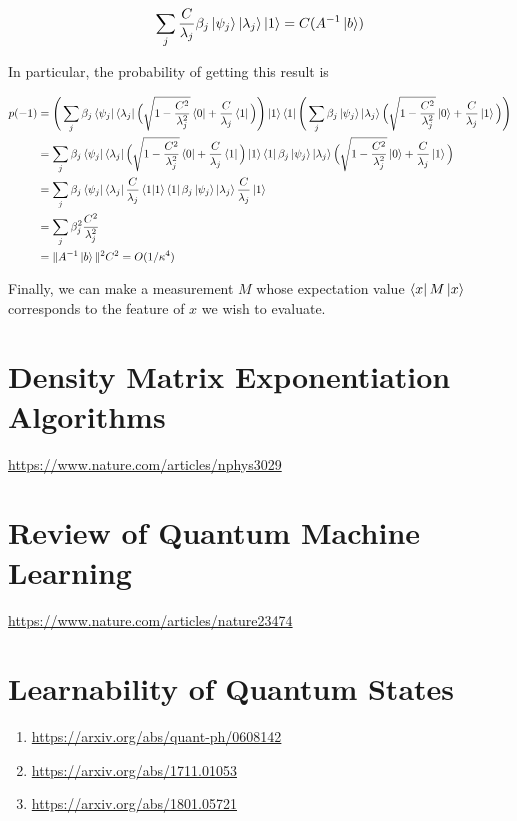 \documentclass[11pt]{article}
\newcommand\0{\mathbf{0}}
\newcommand\<{\langle}
\renewcommand\>{\rangle}
\begin{document}
\begin{align*}
	\sum_j \frac{C}{\lambda_j} \beta_j \ket{\psi_j} \ket{\lambda_j}\ket{1} = C (A^{-1} \ket{b})
\end{align*}

In particular, the probability of getting this result is 

\begin{align*} 
	p(-1) &= \Bigg(\sum_j \beta_j \bra{\psi_j} \bra{\lambda_j} \Big(\sqrt{1-\frac{C^2}{\lambda_j^2}}\bra{0} + \frac{C}{\lambda_j}\bra{1}\Big) \Bigg)\ket{1}\bra{1} \Bigg(\sum_j \beta_j \ket{\psi_j} \ket{\lambda_j} \Big(\sqrt{1-\frac{C^2}{\lambda_j^2}}\ket{0} + \frac{C}{\lambda_j}\ket{1}\Big)\Bigg) \\
	&= \sum_j \beta_j \bra{\psi_j} \bra{\lambda_j} \Big(\sqrt{1-\frac{C^2}{\lambda_j^2}}\bra{0} + \frac{C}{\lambda_j}\bra{1}\Big) \ket{1}\bra{1} \beta_j \ket{\psi_j} \ket{\lambda_j} \Big(\sqrt{1-\frac{C^2}{\lambda_j^2}}\ket{0} + \frac{C}{\lambda_j}\ket{1}\Big) \\
	&= \sum_j \beta_j \bra{\psi_j} \bra{\lambda_j} \frac{C}{\lambda_j}\bra{1}\ket{1}\bra{1} \beta_j \ket{\psi_j} \ket{\lambda_j} \frac{C}{\lambda_j}\ket{1} \\
	&= \sum_j \beta_j^2 \frac{C^2}{\lambda_j^2} \\
	&= \| A^{-1} \ket{b} \|^2 C^2 = O(1/\kappa^4)
\end{align*} 

Finally, we can make a measurement $M$ whose expectation value $\bra{x}M\ket{x}$ corresponds to the feature of $x$ we wish to evaluate. 

\section{Density Matrix Exponentiation Algorithms}
\url{https://www.nature.com/articles/nphys3029}

\section{Review of Quantum Machine Learning}
\url{https://www.nature.com/articles/nature23474}

\section{Learnability of Quantum States}
\begin{enumerate}
\item \url{https://arxiv.org/abs/quant-ph/0608142}
\item \url{https://arxiv.org/abs/1711.01053}
\item \url{https://arxiv.org/abs/1801.05721}
\end{enumerate}
\end{document}
